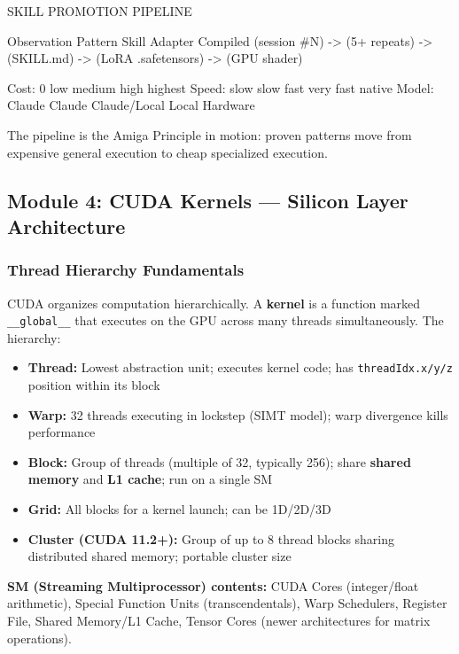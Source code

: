 \documentclass[11pt,letterpaper]{article}
\begin{document}
\begin{asciibox}
SKILL PROMOTION PIPELINE

  Observation      Pattern        Skill          Adapter        Compiled
  (session #N)  -> (5+ repeats) -> (SKILL.md) -> (LoRA .safetensors) -> (GPU shader)
  
  Cost:    0        low           medium          high             highest
  Speed:   slow     slow          fast            very fast        native
  Model:   Claude   Claude        Claude/Local    Local            Hardware
  
  The pipeline is the Amiga Principle in motion:
  proven patterns move from expensive general execution
  to cheap specialized execution.
\end{asciibox}

\subsection{Module 4: CUDA Kernels --- Silicon Layer Architecture}

\subsubsection{Thread Hierarchy Fundamentals}

CUDA organizes computation hierarchically. A \textbf{kernel} is a function marked \texttt{\_\_global\_\_} that executes on the GPU across many threads simultaneously. The hierarchy:

\begin{itemize}[leftmargin=1.5em]
  \item \textbf{Thread:} Lowest abstraction unit; executes kernel code; has \texttt{threadIdx.x/y/z} position within its block
  \item \textbf{Warp:} 32 threads executing in lockstep (SIMT model); warp divergence kills performance
  \item \textbf{Block:} Group of threads (multiple of 32, typically 256); share \textbf{shared memory} and \textbf{L1 cache}; run on a single SM
  \item \textbf{Grid:} All blocks for a kernel launch; can be 1D/2D/3D
  \item \textbf{Cluster (CUDA 11.2+):} Group of up to 8 thread blocks sharing distributed shared memory; portable cluster size
\end{itemize}

\textbf{SM (Streaming Multiprocessor) contents:} CUDA Cores (integer/float arithmetic), Special Function Units (transcendentals), Warp Schedulers, Register File, Shared Memory/L1 Cache, Tensor Cores (newer architectures for matrix operations).
\end{document}

